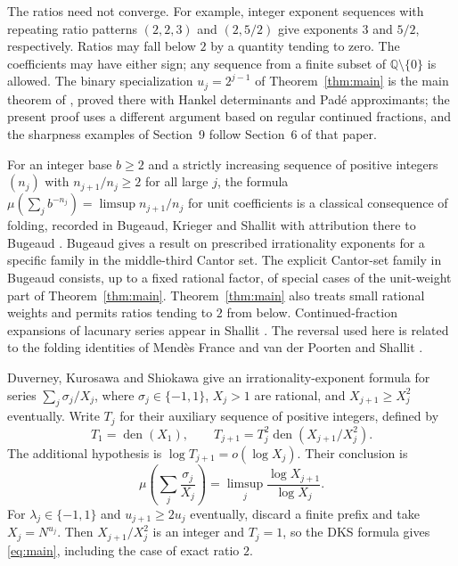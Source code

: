 \documentclass{amsart}
\numberwithin{equation}{section}
\newcommand{\Q}{\mathbb Q}
\newcommand{\den}{\operatorname{den}}
\begin{document}
The ratios need not converge. For example, integer exponent sequences
with repeating ratio patterns $(2,2,3)$ and $(2,5/2)$ give exponents
$3$ and $5/2$, respectively. Ratios may fall below $2$ by a quantity
tending to zero. The coefficients may have either sign; any sequence
from a finite subset of $\Q\setminus\{0\}$ is allowed. The binary specialization
$u_j=2^{j-1}$ of Theorem~\ref{thm:main} is the main theorem of
\cite{Zh}, proved there with Hankel determinants and Pad\'e approximants;
the present proof uses a different argument based on regular continued
fractions, and the sharpness examples of Section~9 follow Section~6 of
that paper.

For an integer base $b\ge2$ and a strictly increasing sequence of
positive integers $(n_j)$ with $n_{j+1}/n_j\ge2$ for all large $j$, the formula
$\mu(\sum_j b^{-n_j})=\limsup n_{j+1}/n_j$ for unit coefficients is a
classical consequence of folding, recorded in Bugeaud, Krieger and Shallit
\cite{BKS} with attribution there to Bugeaud \cite{Bu08}. Bugeaud \cite[Theorem~7.21]{Bu12} gives a result on prescribed
irrationality exponents for a specific family in the middle-third Cantor set.
The explicit Cantor-set family in Bugeaud \cite[Theorem~2]{Bu08} consists,
up to a fixed rational factor, of special cases of the unit-weight part of
Theorem~\ref{thm:main}.
Theorem~\ref{thm:main} also treats small rational weights and permits ratios
tending to $2$ from below.
Continued-fraction expansions of lacunary series appear in Shallit
\cite{Sh79,Sh82}. The reversal used here is
related to the folding identities of Mend\`es France \cite{MF}
and van der Poorten and Shallit \cite{vPS}.

Duverney, Kurosawa and Shiokawa \cite[Theorem~1]{DKS} give an
irrationality-exponent formula for series
$\sum_j\sigma_j/X_j$, where $\sigma_j\in\{-1,1\}$,
$X_j>1$ are rational, and $X_{j+1}\ge X_j^2$ eventually. Write $T_j$
for their auxiliary sequence of positive integers, defined by
\begin{equation}\label{eq:DKS}
T_1=\den(X_1),\qquad
T_{j+1}=T_j^2\den(X_{j+1}/X_j^2).
\end{equation}
The additional hypothesis is
$\log T_{j+1}=o(\log X_j)$.
Their conclusion is
\begin{equation}\label{eq:DKSconclusion}
\mu\!\left(\sum_j\frac{\sigma_j}{X_j}\right)
=\limsup_j\frac{\log X_{j+1}}{\log X_j}.
\end{equation}
For $\lambda_j\in\{-1,1\}$ and $u_{j+1}\ge2u_j$ eventually, discard
a finite prefix and take $X_j=N^{u_j}$. Then $X_{j+1}/X_j^2$ is an
integer and $T_j=1$, so the DKS formula gives \eqref{eq:main}, including
the case of exact ratio $2$.
\end{document}
